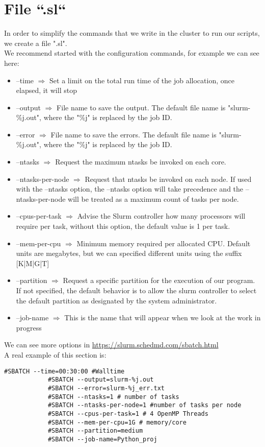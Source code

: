 \documentclass[a4paper]{article}
\begin{document}
	\section{File ``.sl``}
		In order to simplify the commands that we write in the cluster to run our scripts, we create a file ".sl".\\
		We recommend started with the configuration commands, for example we can see here:
		\begin{itemize}
			\item --time $\Rightarrow$ Set a limit on the total run time of the job allocation, once elapsed, it will stop
			\item --output $\Rightarrow$ File name to save the output. The default file name is "slurm-\%j.out", where the "\%j" is replaced by the job ID.
			\item --error $\Rightarrow$  File name to save the errors. The default file name is "slurm-\%j.out", where the "\%j" is replaced by the job ID.
			\item --ntasks $\Rightarrow$ Request the maximum ntasks be invoked on each core.	
			\item --ntasks-per-node $\Rightarrow$ Request that ntasks be invoked on each node. If used with the --ntasks option, the --ntasks option will take precedence and the --ntasks-per-node will be treated as a maximum count of tasks per node.
			\item --cpus-per-task $\Rightarrow$ Advise the Slurm controller how many processors will require per task, without this option, the default value is 1 per task.
			\item --mem-per-cpu $\Rightarrow$ Minimum memory required per allocated CPU. Default units are megabytes, but we can specified different units using the suffix [K|M|G|T]
			\item --partition $\Rightarrow$ Request a specific partition for the execution of our program. If not specified, the default behavior is to allow the slurm controller to select the default partition as designated by the system administrator.
			\item --job-name $\Rightarrow$ This is the name that will appear when we look at the work in progress 
		\end{itemize} 
		We can see more options in \url{https://slurm.schedmd.com/sbatch.html}\\
		A real example of this section is:\\
		\begin{lstlisting}[caption=Connection Hipatia, label=lst:connectionHipatia]
			#SBATCH --time=00:30:00 #Walltime
			#SBATCH --output=slurm-%j.out
			#SBATCH --error=slurm-%j_err.txt
			#SBATCH --ntasks=1 # number of tasks
			#SBATCH --ntasks-per-node=1 #number of tasks per node
			#SBATCH --cpus-per-task=1 # 4 OpenMP Threads
			#SBATCH --mem-per-cpu=1G # memory/core
			#SBATCH --partition=medium
			#SBATCH --job-name=Python_proj
		\end{lstlisting}
\end{document}
